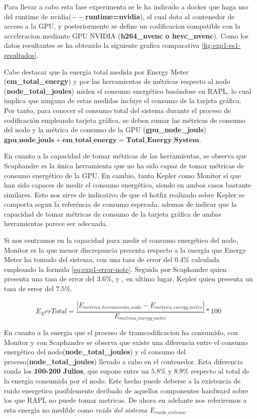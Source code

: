  Para llevar a cabo esta fase experimenta se le ha indicado a docker que haga uso del runtime de nvidia(\textbf{$--$runtime=nvidia}), el cual dota al contenedor de acceso a la GPU, y posteriormente se define un codificacion compatible con la acceleracion mediante GPU NVIDIA (\textbf{h264\_nvenc o hevc\_nvenc}). Como los datos resultantes se ha obtenido la siguiente grafica comparativa \ref{fig:exp1-es1-resultados}.

 Cabe destacar que la energía total medida por Energy Meter (\textbf{em\_total\_energy}) y por las herramientas de métricas respecto al nodo (\textbf{node\_total\_joules}) miden el consumo energético basándose en RAPL, lo cual implica que ninguna de estas medidas incluye el consumo de la tarjeta gráfica. Por tanto, para conocer el consumo total del sistema durante el proceso de codificación empleando tarjeta gráfica, se deben sumar las métricas de consumo del nodo y la métrica de consumo de la GPU (\textbf{gpu\_node\_jouls}) \(\textbf{gpu\_node\_jouls}+\textbf{em\_total\_energy} = \textbf{Total\_Energy\_System}\).

 En cuanto a la capacidad de tomar métricas de las herramientas, se observa que Scaphandre es la única herramienta que no ha sido capaz de tomar métricas de consumo energético de la GPU. En cambio, tanto Kepler como Monitor sí que han sido capaces de medir el consumo energético, siendo en ambos casos bastante similares. Esto nos sirve de indicativo de que el hotfix realizado sobre Kepler se comporta segun la referéncia de consumo esperada, ademas de indicar que la capacidad de tomar métricas de consumo de la tarjeta gráfica de ambas herramientas parece ser adecuada.

 Si nos centramos en la capacidad para medir el consumo energético del nodo, Monitor es la que menor discrepancia presenta respecto a la energía que Energy Meter ha tomado del sistema, con una tasa de error del $0.4\%$ calculada empleando la formula \ref{eq:exp1-error-note}. Seguida por Scaphandre quien presenta una tasa de error del $3.6\%$, y , en ultimo lugar, Kepler quien presenta un tasa de error del $7.5\%$.
 
 \[E{_ErrTotal} = \frac{|E_{metrica\_herramienta\_nodo}-E_{metrica\_energy\_meter}|}{E_{metrica\_energy\_meter}}*100 \label{eq:exp1-error-note}\]

 En cuanto a la energia que el proceso de transcodificacion ha consumido, con Monitor y con Scaphandre se observa que existe una diferencia entre el consumo energético del nodo(\textbf{node\_total\_joules}) y el consumo del proceso(\textbf{node\_total\_joules}) llevado a cabo en el contenedor. Esta diferencia ronda los \textbf{100-200 Julios}, que supone entre un \textbf{\(5.8\%\)} y \textbf{\(8.9\%\)} respecto al total de la energia consumida por el nodo. Este hecho puede deberse a la existencia de ruido energetico posiblemente deribado de aquellos componentes hardward sobre los que RAPL no puede tomar metricas. De ahora en adelante nos referiremos a esta energia no medible como \textit{ruido del sistema $E_{ruido\_sistema}$}.
 
